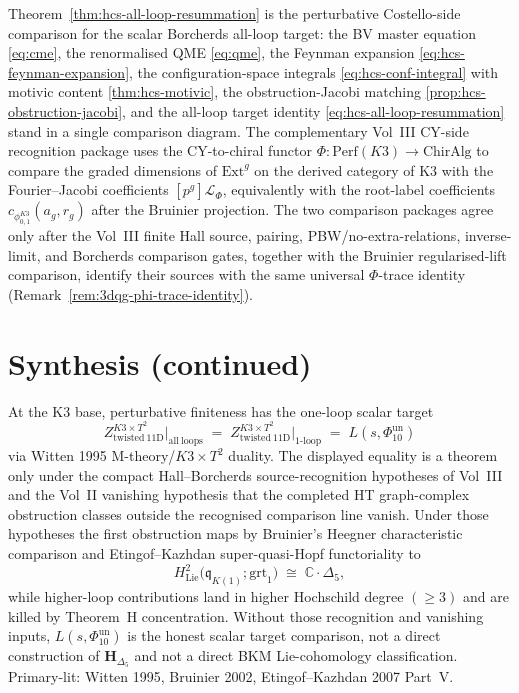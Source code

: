 \begin{remark}
\label{rem:hcs-two-sides}
Theorem~\ref{thm:hcs-all-loop-resummation} is the perturbative
Costello-side comparison for the scalar Borcherds all-loop target: the BV
master equation \eqref{eq:cme}, the renormalised QME \eqref{eq:qme},
the Feynman expansion \eqref{eq:hcs-feynman-expansion}, the
configuration-space integrals \eqref{eq:hcs-conf-integral} with motivic
content \ref{thm:hcs-motivic}, the obstruction-Jacobi matching
\ref{prop:hcs-obstruction-jacobi}, and the all-loop target identity
\eqref{eq:hcs-all-loop-resummation} stand in a single comparison
diagram. The complementary Vol~III CY-side recognition package uses
the CY-to-chiral functor $\Phi\colon\mathrm{Perf}(K3)\to\mathrm{ChirAlg}$
to compare the graded dimensions of $\mathrm{Ext}^{g}$ on the derived
category of K3 with the Fourier--Jacobi coefficients
\([p^g]\mathcal L_{\Phi}\), equivalently with the root-label coefficients
\(c_{\phi_{0,1}^{K3}}(a_g,r_g)\) after the Bruinier projection. The two
comparison packages agree only after
the Vol~III finite Hall source, pairing, PBW/no-extra-relations,
inverse-limit, and Borcherds comparison gates, together with the
Bruinier regularised-lift comparison, identify their sources with the
same universal $\Phi$-trace identity
(Remark~\ref{rem:3dqg-phi-trace-identity}).
\end{remark}

\section{Synthesis (continued)}
\label{sec:pf-deep}

\begin{remark}
\label{rem:pf-deep-1}
At the K3 base, perturbative finiteness has the one-loop scalar target
\[
Z_{\mathrm{twisted\ 11D}}^{K3\times T^2}\big|_{\mathrm{all\ loops}} \;=\; Z_{\mathrm{twisted\ 11D}}^{K3\times T^2}\big|_{\mathrm{1\text{-}loop}} \;=\; L(s,\Phi_{10}^{\mathrm{un}})
\]
via Witten 1995 M-theory/$K3\times T^2$ duality.  The displayed
equality is a theorem only under the compact Hall--Borcherds
source-recognition hypotheses of Vol~III and the Vol~II vanishing
hypothesis that the completed HT graph-complex obstruction classes
outside the recognised comparison line vanish.  Under those hypotheses
the first obstruction maps by Bruinier's Heegner characteristic
comparison and Etingof--Kazhdan super-quasi-Hopf functoriality to
\[
H^2_{\mathrm{Lie}}\bigl(\mathfrak q_{K(1)};\mathrm{grt}_1\bigr)
\;\cong\; \mathbb C\cdot\Delta_5,
\]
while higher-loop contributions land in higher Hochschild degree
$(\ge 3)$ and are killed by Theorem~H concentration.  Without those
recognition and vanishing inputs, $L(s,\Phi_{10}^{\mathrm{un}})$ is the
honest scalar target comparison, not a direct construction of
$\mathbf H_{\Delta_5}$ and not a direct BKM Lie-cohomology
classification.  Primary-lit: Witten 1995, Bruinier 2002,
Etingof--Kazhdan 2007 Part~V.
\end{remark}

